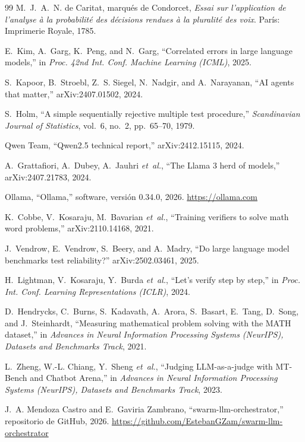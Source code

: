 \documentclass[conference]{IEEEtran}
\begin{document}
\begin{thebibliography}{99}
M.~J.~A.~N. de Caritat, marqués de Condorcet, \emph{Essai sur l'application de l'analyse à la probabilité des décisions rendues à la pluralité des voix}. París: Imprimerie Royale, 1785.

E.~Kim, A.~Garg, K.~Peng, and N.~Garg, ``Correlated errors in large language models,'' in \emph{Proc. 42nd Int. Conf. Machine Learning (ICML)}, 2025.

S.~Kapoor, B.~Stroebl, Z.~S. Siegel, N.~Nadgir, and A.~Narayanan, ``AI agents that matter,'' arXiv:2407.01502, 2024.

S.~Holm, ``A simple sequentially rejective multiple test procedure,'' \emph{Scandinavian Journal of Statistics}, vol.~6, no.~2, pp.~65--70, 1979.

Qwen Team, ``Qwen2.5 technical report,'' arXiv:2412.15115, 2024.

A.~Grattafiori, A.~Dubey, A.~Jauhri \emph{et~al.}, ``The Llama 3 herd of models,'' arXiv:2407.21783, 2024.

Ollama, ``Ollama,'' software, versión 0.34.0, 2026. \url{https://ollama.com}

K.~Cobbe, V.~Kosaraju, M.~Bavarian \emph{et~al.}, ``Training verifiers to solve math word problems,'' arXiv:2110.14168, 2021.

J.~Vendrow, E.~Vendrow, S.~Beery, and A.~Madry, ``Do large language model benchmarks test reliability?'' arXiv:2502.03461, 2025.

H.~Lightman, V.~Kosaraju, Y.~Burda \emph{et~al.}, ``Let's verify step by step,'' in \emph{Proc. Int. Conf. Learning Representations (ICLR)}, 2024.

D.~Hendrycks, C.~Burns, S.~Kadavath, A.~Arora, S.~Basart, E.~Tang, D.~Song, and J.~Steinhardt, ``Measuring mathematical problem solving with the MATH dataset,'' in \emph{Advances in Neural Information Processing Systems (NeurIPS), Datasets and Benchmarks Track}, 2021.

L.~Zheng, W.-L. Chiang, Y.~Sheng \emph{et~al.}, ``Judging LLM-as-a-judge with MT-Bench and Chatbot Arena,'' in \emph{Advances in Neural Information Processing Systems (NeurIPS), Datasets and Benchmarks Track}, 2023.

J.~A. Mendoza Castro and E.~Gaviria Zambrano, ``swarm-llm-orchestrator,'' repositorio de GitHub, 2026. \url{https://github.com/EstebanGZam/swarm-llm-orchestrator}

\end{thebibliography}
\end{document}
